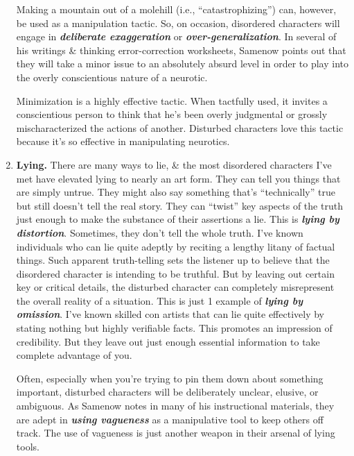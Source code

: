 \documentclass{article}
\numberwithin{equation}{section}
\begin{document}
\begin{enumerate}
	Making a mountain out of a molehill (i.e., ``catastrophizing'') can, however, be used as a manipulation tactic. So, on occasion, disordered characters will engage in \textbf{\textit{deliberate exaggeration}} or \textbf{\textit{over-generalization}}. In several of his writings \& thinking error-correction worksheets, Samenow points out that they will take a minor issue to an absolutely absurd level in order to play into the overly conscientious nature of a neurotic.
	
	Minimization is a highly effective tactic. When tactfully used, it invites a conscientious person to think that he's been overly judgmental or grossly mischaracterized the actions of another. Disturbed characters love this tactic because it's so effective in manipulating neurotics.
	\item \textbf{Lying.} There are many ways to lie, \& the most disordered characters I've met have elevated lying to nearly an art form. They can tell you things that are simply untrue. They might also say something that's ``technically'' true but still doesn't tell the real story. They can ``twist'' key aspects of the truth just enough to make the substance of their assertions a lie. This is \textbf{\textit{lying by distortion}}. Sometimes, they don't tell the whole truth. I've known individuals who can lie quite adeptly by reciting a lengthy litany of factual things. Such apparent truth-telling sets the listener up to believe that the disordered character is intending to be truthful. But by leaving out certain key or critical details, the disturbed character can completely misrepresent the overall reality of a situation. This is just 1 example of \textbf{\textit{lying by omission}}. I've known skilled con artists that can lie quite effectively by stating nothing but highly verifiable facts. This promotes an impression of credibility. But they leave out just enough essential information to take complete advantage of you.
	
	Often, especially when you're trying to pin them down about something important, disturbed characters will be deliberately unclear, elusive, or ambiguous. As Samenow notes in many of his instructional materials, they are adept in \textbf{\textit{using vagueness}} as a manipulative tool to keep others off track. The use of vagueness is just another weapon in their arsenal of lying tools.
	

\end{enumerate}
\end{document}
